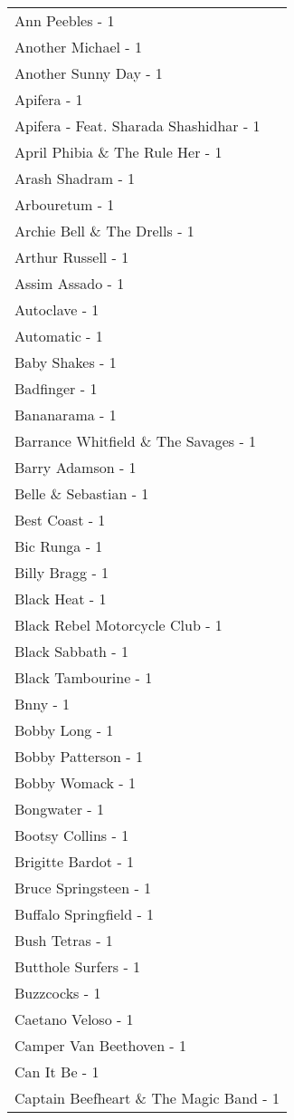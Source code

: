 \documentclass[
]{article}
\begin{document}
\begin{longtable}{l}
Ann Peebles - 1 \\ 
Another Michael - 1 \\ 
Another Sunny Day - 1 \\ 
Apifera - 1 \\ 
Apifera - Feat. Sharada Shashidhar - 1 \\ 
April Phibia \& The Rule Her - 1 \\ 
Arash Shadram - 1 \\ 
Arbouretum - 1 \\ 
Archie Bell \& The Drells - 1 \\ 
Arthur Russell - 1 \\ 
Assim Assado - 1 \\ 
Autoclave - 1 \\ 
Automatic - 1 \\ 
Baby Shakes - 1 \\ 
Badfinger - 1 \\ 
Bananarama - 1 \\ 
Barrance Whitfield \& The Savages - 1 \\ 
Barry Adamson - 1 \\ 
Belle \& Sebastian - 1 \\ 
Best Coast - 1 \\ 
Bic Runga - 1 \\ 
Billy Bragg - 1 \\ 
Black Heat - 1 \\ 
Black Rebel Motorcycle Club - 1 \\ 
Black Sabbath - 1 \\ 
Black Tambourine - 1 \\ 
Bnny - 1 \\ 
Bobby Long - 1 \\ 
Bobby Patterson - 1 \\ 
Bobby Womack - 1 \\ 
Bongwater - 1 \\ 
Bootsy Collins - 1 \\ 
Brigitte Bardot - 1 \\ 
Bruce Springsteen - 1 \\ 
Buffalo Springfield - 1 \\ 
Bush Tetras - 1 \\ 
Butthole Surfers - 1 \\ 
Buzzcocks - 1 \\ 
Caetano Veloso - 1 \\ 
Camper Van Beethoven - 1 \\ 
Can It Be - 1 \\ 
Captain Beefheart \& The Magic Band - 1 \\ 

\end{longtable}
\end{document}
